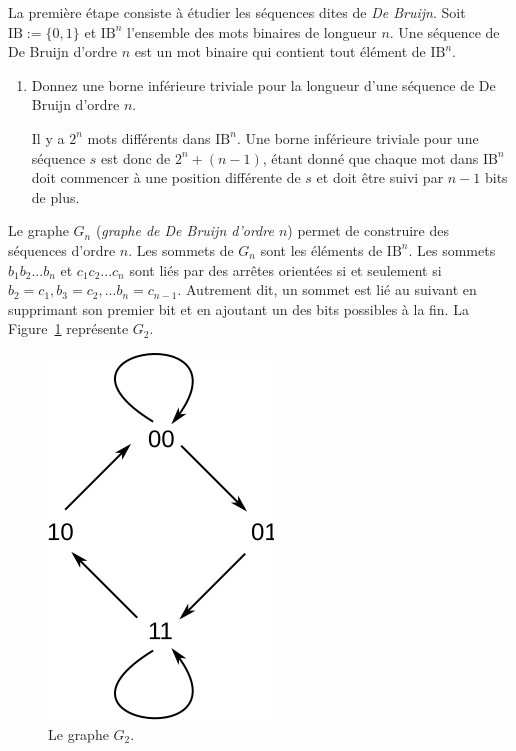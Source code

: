 \documentclass[11pt]{article}
\def\bool{\mathrm{I\!B}}
\begin{document}
La première étape consiste à étudier les séquences dites de \emph{De Bruijn}.
Soit $\bool:=\{0,1\}$ et $\bool^n$ l'ensemble des mots binaires de longueur $n$.
Une séquence de De Bruijn d'ordre $n$ est un mot binaire qui contient
tout élément de $\bool^n$.

\begin{enumerate}
\item 
 Donnez une borne inférieure triviale pour la longueur d'une séquence
 de De Bruijn d'ordre $n$.

\begin{solution}
Il y a $2^n$ mots différents dans $\bool^n$.
Une borne inférieure triviale pour une séquence $s$ est donc
de $2^n+(n-1)$, étant donné que chaque mot dans $\bool^n$
doit commencer à une position différente de $s$ et doit être suivi
par $n-1$ bits de plus.
\end{solution}
\end{enumerate}

Le graphe $G_n$ (\emph{graphe de De Bruijn d'ordre $n$})
permet de construire des séquences d'ordre $n$.
Les sommets de $G_n$ sont les éléments de $\bool^n$.
Les sommets $b_1b_2...b_n$ et $c_1c_2...c_n$ sont liés par des
arrêtes orientées si et seulement si $b_2=c_1,b_3=c_2,...b_n=c_{n-1}$.
Autrement dit, un sommet est lié au suivant en
supprimant son premier bit et en ajoutant un des bits possibles à la fin.
La Figure~\ref{DeBruijnOrdre2} représente $G_2$.

\begin{figure}[h]
 \centering
 \includegraphics{order-2}
 \caption{\label{DeBruijnOrdre2}Le graphe $G_2$.}
\end{figure}
\end{document}
